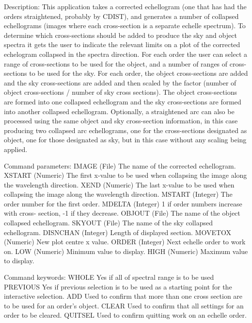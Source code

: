 \begin{description}
\begin{description}
\begin{terminalv}
 Description:
    This application takes a corrected echellogram (one that has had
    the orders straightened, probably by CDIST), and generates a
    number of collapsed echellograms (images where each cross-section
    is a separate echelle spectrum).  To determine which cross-sections
    should be added to produce the sky and object spectra it gets the
    user to indicate the relevant limits on a plot of the corrected
    echelogram collapsed in the spectra direction.  For each order
    the user can select a range of cross-sections to be used for the
    object, and a number of ranges of cross-sections to be used for
    the sky.  For each order, the object cross-sections are added
    and the sky cross-sections are added and then scaled by the
    factor (number of object cross-sections / number of sky cross
    sections).  The object cross-sections are formed into one collapsed
    echellogram and the sky cross-sections are formed into another
    collapsed echellogram.  Optionally, a straightened arc can also
    be processed using the same object and sky cross-section information,
    in this case producing two collapsed arc echellograms, one for the
    cross-sections designated as object, one for those designated as
    sky, but in this case without any scaling being applied.

 Command parameters:
    IMAGE       (File) The name of the corrected echellogram.
    XSTART      (Numeric) The first x-value to be used when collapsing
                the image along the wavelength direction.
    XEND        (Numeric) The last x-value to be used when collapsing
                the image along the wavelength direction.
    MSTART      (Integer) The order number for the first order.
    MDELTA      (Integer) 1 if order numbers increase with cross-
                section, -1 if they decrease.
    OBJOUT      (File) The name of the object collapsed echellogram.
    SKYOUT      (File) The name of the sky collapsed echellogram.
    DISNCHAN    (Integer) Length of displayed section.
    MOVETOX     (Numeric) New plot centre x value.
    ORDER       (Integer) Next echelle order to work on.
    LOW         (Numeric) Minimum value to display.
    HIGH        (Numeric) Maximum value to display.

 Command keywords:
    WHOLE       Yes if all of spectral range is to be used
    PREVIOUS    Yes if previous selection is to be used as a starting
                point for the interactive selection.
    ADD         Used to confirm that more than one cross section are
                to be used for an order's object.
    CLEAR       Used to confirm that all settings for an order to be
                cleared.
    QUITSEL     Used to confirm quitting work on an echelle order.


\end{terminalv}
\end{description}
\end{description}
